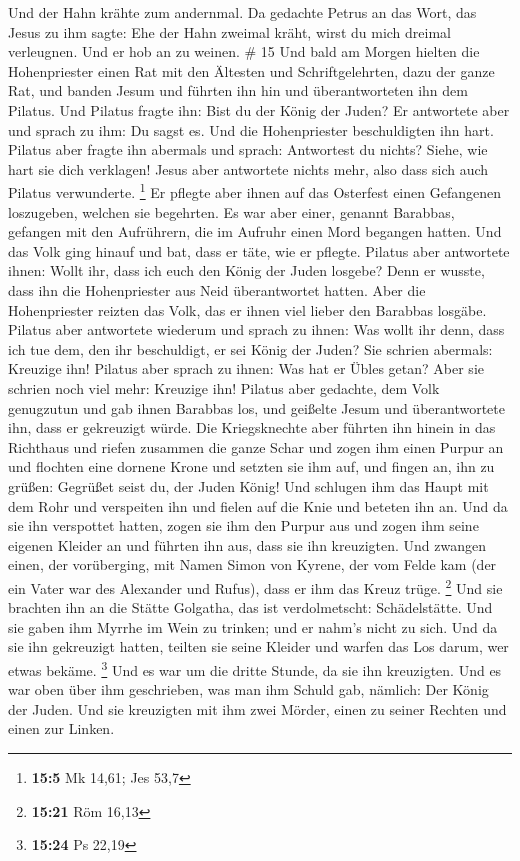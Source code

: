  Und der Hahn krähte zum andernmal. Da gedachte Petrus an
das Wort, das Jesus zu ihm sagte: Ehe der Hahn zweimal kräht, wirst du
mich dreimal verleugnen. Und er hob an zu weinen. \# 15  Und
bald am Morgen hielten die Hohenpriester einen Rat mit den Ältesten und
Schriftgelehrten, dazu der ganze Rat, und banden Jesum und führten ihn
hin und überantworteten ihn dem Pilatus.  Und Pilatus fragte
ihn: Bist du der König der Juden? Er antwortete aber und sprach zu ihm:
Du sagst es.  Und die Hohenpriester beschuldigten ihn hart.
 Pilatus aber fragte ihn abermals und sprach: Antwortest du
nichts? Siehe, wie hart sie dich verklagen!  Jesus aber
antwortete nichts mehr, also dass sich auch Pilatus verwunderte.
\footnote{\textbf{15:5} Mk 14,61; Jes 53,7}  Er pflegte aber
ihnen auf das Osterfest einen Gefangenen loszugeben, welchen sie
begehrten.  Es war aber einer, genannt Barabbas, gefangen
mit den Aufrührern, die im Aufruhr einen Mord begangen hatten.
 Und das Volk ging hinauf und bat, dass er täte, wie er
pflegte.  Pilatus aber antwortete ihnen: Wollt ihr, dass ich
euch den König der Juden losgebe?  Denn er wusste, dass ihn
die Hohenpriester aus Neid überantwortet hatten.  Aber die
Hohenpriester reizten das Volk, das er ihnen viel lieber den Barabbas
losgäbe.  Pilatus aber antwortete wiederum und sprach zu
ihnen: Was wollt ihr denn, dass ich tue dem, den ihr beschuldigt, er sei
König der Juden?  Sie schrien abermals: Kreuzige ihn!
 Pilatus aber sprach zu ihnen: Was hat er Übles getan? Aber
sie schrien noch viel mehr: Kreuzige ihn!  Pilatus aber
gedachte, dem Volk genugzutun und gab ihnen Barabbas los, und geißelte
Jesum und überantwortete ihn, dass er gekreuzigt würde. 
Die Kriegsknechte aber führten ihn hinein in das Richthaus und riefen
zusammen die ganze Schar  und zogen ihm einen Purpur an und
flochten eine dornene Krone und setzten sie ihm auf,  und
fingen an, ihn zu grüßen: Gegrüßet seist du, der Juden König!
 Und schlugen ihm das Haupt mit dem Rohr und verspeiten ihn
und fielen auf die Knie und beteten ihn an.  Und da sie ihn
verspottet hatten, zogen sie ihm den Purpur aus und zogen ihm seine
eigenen Kleider an und führten ihn aus, dass sie ihn kreuzigten.
 Und zwangen einen, der vorüberging, mit Namen Simon von
Kyrene, der vom Felde kam (der ein Vater war des Alexander und Rufus),
dass er ihm das Kreuz trüge. \footnote{\textbf{15:21} Röm 16,13}
 Und sie brachten ihn an die Stätte Golgatha, das ist
verdolmetscht: Schädelstätte.  Und sie gaben ihm Myrrhe im
Wein zu trinken; und er nahm's nicht zu sich.  Und da sie
ihn gekreuzigt hatten, teilten sie seine Kleider und warfen das Los
darum, wer etwas bekäme. \footnote{\textbf{15:24} Ps 22,19}
 Und es war um die dritte Stunde, da sie ihn kreuzigten.
 Und es war oben über ihm geschrieben, was man ihm Schuld
gab, nämlich: Der König der Juden.  Und sie kreuzigten mit
ihm zwei Mörder, einen zu seiner Rechten und einen zur Linken.

